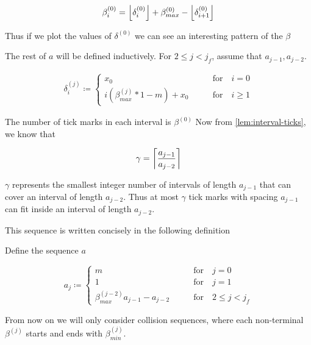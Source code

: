 \begin{align}\label{eq:beta_i}
	\beta^{(0)}_i = \floor{\delta^{(0)}_i} + \beta^{(0)}_{max} - \floor{\delta^{(0)}_{i+1}}
\end{align}

Thus if we plot the values of $\delta^{(0)}$ we can see an interesting pattern of the $\beta$

The rest of $a$ will be defined inductively. For $2 \le j < j_f$, assume that $a_{j-1}, a_{j-2}$.

\begin{align}\label{delta_beta}
	\delta^{(j)}_i \coloneqq \begin{cases}
		x_0 \qquad &\text{for} \quad i = 0\\
		i (\beta^{(j)}_{max} * 1 - m) + x_0 \qquad &\text{for} \quad i \ge 1
	\end{cases}
\end{align}

The number of tick marks in each interval is $\beta^{(0)}$
Now from \ref{lem:interval-ticks}, we know that 

\begin{align}
	\gamma = \ceil{\frac{a_{j-1}}{a_{j-2}}}
\end{align}

$\gamma$ represents the smallest integer number of intervals of length $a_{j-1}$ that can cover an interval of length $a_{j-2}$. Thus at most $\gamma$ tick marks with spacing $a_{j-1}$ can fit inside an interval of length $a_{j-2}$. 

This sequence is written concisely in the following definition

\begin{definition}
	Define the sequence $a$

	\begin{equation}
		a_j \coloneqq \begin{cases}
			m \qquad &\text{for} \quad j = 0\\
			1 \qquad &\text{for} \quad j = 1\\
			\beta^{(j-2)}_{max} a_{j-1} - a_{j-2} \qquad &\text{for} \quad 2 \le j < j_f
		\end{cases}
	\end{equation}

\end{definition}

From now on we will only consider collision sequences, where each non-terminal $\beta^{(j)}$ starts and ends with $\beta^{(j)}_{min}$.

